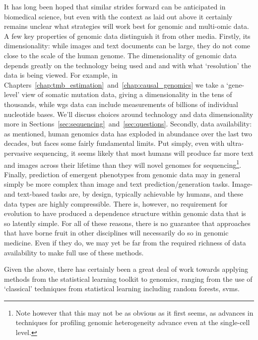 \documentclass[thesis.tex]{subfiles}
\begin{document}
It has long been hoped that similar strides forward can be anticipated in biomedical science, but even with the context as laid out above it certainly remains unclear what strategies will work best for genomic and multi-omic data. A few key properties of genomic data distinguish it from other media. Firstly, its dimensionality: while images and text documents can be large, they do not come close to the scale of the human genome. The dimensionality of genomic data depends greatly on the technology being used and and with what `resolution' the data is being viewed. For example, in Chapters~\ref{chap:tmb_estimation}~and~\ref{chap:causal_genomics} we take a `gene-level' view of somatic mutation data, giving a dimensionality in the tens of thousands, while \gls{wgs} data can include measurements of billions of individual nucleotide bases. We'll discuss choices around technology and data dimensionality more in Sections~\ref{sec:sequencing}~and~\ref{sec:questions}. Secondly, data availability: as mentioned, human genomics data has exploded in abundance over the last two decades, but faces some fairly fundamental limits. Put simply, even with ultra-pervasive sequencing, it seems likely that most humans will produce far more text and images across their lifetime than they will novel genomes for sequencing\footnote{Note however that this may not be as obvious as it first seems, as advances in techniques for profiling genomic heterogeneity advance even at the single-cell level.}. Finally, prediction of emergent phenotypes from genomic data may in general simply be more complex than image and text prediction/generation tasks. Image- and text-based tasks are, by design, typically achievable by humans, and these data types are highly compressible. There is, however, no requirement for evolution to have produced a dependence structure within genomic data that is so latently simple. For all of these reasons, there is no guarantee that approaches that have borne fruit in other disciplines will necessarily do so in genomic medicine. Even if they do, we may yet be far from the required richness of data availability to make full use of these methods.

Given the above, there has certainly been a great deal of work towards applying methods from the statistical learning toolkit to genomics, ranging from the use of `classical' techniques from statistical learning including random forests, \glspl{svm}. 
 
\end{document}
